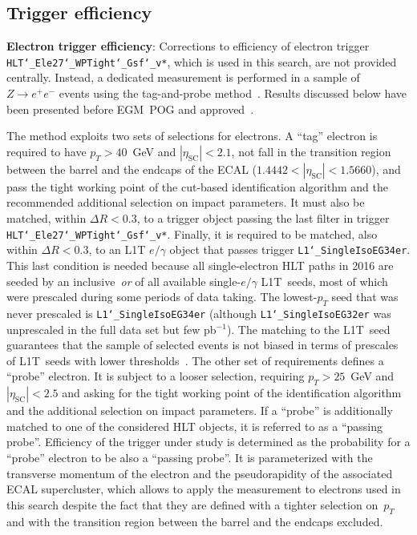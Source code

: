 \subsection{Trigger efficiency}\label{subsec:elec_trigg}
%
\textbf{Electron trigger efficiency}: Corrections to efficiency of electron trigger \texttt{HLT\char`_Ele27\char`_WPTight\char`_Gsf\char`_v*}, which is used in this search, are not provided centrally.
Instead, a dedicated measurement is performed in a sample of $Z \rightarrow e^+e^-$ events using the tag-and-probe method~\cite{CMS-AN-09-111, Khachatryan:2010xn, CMS-AN-12-116}.
Results discussed below have been presented before EGM~POG and approved~\cite{Talk:EleTriggerSF}.

The method exploits two sets of selections for electrons.
A ``tag'' electron is required to have $p_{T} > 40$~GeV{} and $|\eta_\text{SC}| < 2.1$, not fall in the transition region between the barrel and the endcaps of the ECAL ($1.4442 < |\eta_\text{SC}| < 1.5660$), and pass the tight working point of the cut-based identification algorithm and the recommended additional selection on impact parameters.
It must also be matched, within $\Delta R < 0.3$, to a trigger object passing the last filter in trigger \texttt{HLT\char`_Ele27\char`_WPTight\char`_Gsf\char`_v*}.
Finally, it is required to be matched, also within $\Delta R < 0.3$, to an L1T $e/\gamma$ object that passes trigger \texttt{L1\char`_SingleIsoEG34er}.
This last condition is needed because all single-electron HLT paths in 2016 are seeded by an inclusive~\textit{or} of all available single-$e/\gamma$ L1T~seeds, most of which were prescaled during some periods of data taking.
The lowest-$p_{T}$ seed that was never prescaled is \texttt{L1\char`_SingleIsoEG34er} (although \texttt{L1\char`_SingleIsoEG32er} was unprescaled in the full data set but few pb$^{-1}$).
The matching to the L1T~seed guarantees that the sample of selected events is not biased in terms of prescales of L1T~seeds with lower thresholds~\cite{Talk:L1EGPrescales}.
The other set of requirements defines a ``probe'' electron.
It is subject to a looser selection, requiring $p_{T} > 25$~GeV and $|\eta_\text{SC}| < 2.5$ and asking for the tight working point of the identification algorithm and the additional selection on impact parameters.
If a ``probe'' is additionally matched to one of the considered HLT objects, it is referred to as a ``passing probe''.
Efficiency of the trigger under study is determined as the probability for a ``probe'' electron to be also a ``passing probe''.
It is parameterized with the transverse momentum of the electron and the pseudorapidity of the associated ECAL supercluster, which allows to apply the measurement to electrons used in this search despite the fact that they are defined with a tighter selection on~$p_{T}$ and with the transition region between the barrel and the endcaps excluded.

